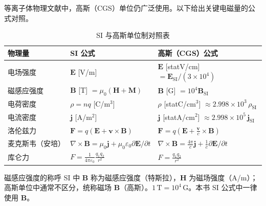 \documentclass[12pt,a4paper,openany,oneside]{book}
\newcommand{\eps}{\varepsilon}
\newcommand{\vect}[1]{\bm{#1}}
\newcommand{\curl}{\nabla\times}
\begin{document}
等离子体物理文献中，高斯（CGS）单位仍广泛使用。以下给出关键电磁量的公式对照。

\begin{table}[htbp]
\centering
\caption{SI 与高斯单位制对照表}
\label{tab:unit-conversion}
\begin{tabular}{@{}p{3.5cm}p{5.5cm}p{5.5cm}@{}}
\toprule
\textbf{物理量} & \textbf{SI 公式} & \textbf{高斯（CGS）公式} \\
\midrule
电场强度 & $\vect{E}$ [V/m] & $\vect{E}$ [statV/cm] $= \vect{E}_\text{SI}/(3\times 10^4)$ \\
磁感应强度 & $\vect{B}$ [T] $=\mu_0(\vect{H}+\vect{M})$ & $\vect{B}$ [G] $= 10^4\vect{B}_\text{SI}$ \\
电荷密度 & $\rho = nq$ [C/m$^3$] & $\rho$ [statC/cm$^3$] $\approx 2.998\times 10^{3}\,\rho_\text{SI}$ \\
电流密度 & $\vect{j}$ [A/m$^2$] & $\vect{j}$ [statA/cm$^2$] $\approx 2.998\times 10^{5}\,\vect{j}_\text{SI}$ \\
洛伦兹力 & $\vect{F}=q(\vect{E}+\vect{v}\times\vect{B})$ & $\vect{F}=q\left(\vect{E}+\frac{\vect{v}}{c}\times\vect{B}\right)$ \\
麦克斯韦（安培） & $\curl\vect{B}=\mu_0\vect{j}+\mu_0\eps_0\partial\vect{E}/\partial t$ & $\curl\vect{B}=\frac{4\pi}{c}\vect{j}+\frac{1}{c}\partial\vect{E}/\partial t$ \\
库仑力 & $F=\frac{1}{4\pi\eps_0}\frac{q_1q_2}{r^2}$ & $F=\frac{q_1q_2}{r^2}$ \\
\bottomrule
\end{tabular}
\end{table}

\begin{warning}{磁感应强度的称呼}{}
SI 中 $\vect{B}$ 称为磁感应强度（特斯拉），$\vect{H}$ 为磁场强度（A/m）；高斯单位中通常不区分，统称磁场 $\vect{B}$（高斯）。$1\,\text{T} = 10^4\,\text{G}$。本书 SI 公式中一律使用 $\vect{B}$。
\end{warning}
\end{document}
